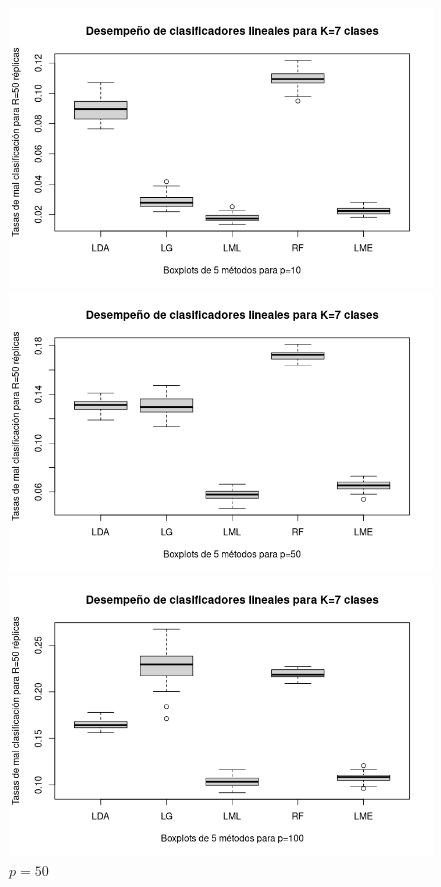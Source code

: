 \documentclass{report}
\begin{document}
  
  \begin{figure} [h]
  	\begin{multicols}{2}
  		\includegraphics[width=\linewidth]{7_clases_p10_sigma_II}\par 
  		\caption*{$p=10$}
  		\includegraphics[width=\linewidth]{7_clases_p50_sigma_II}\par 
  		\caption*{$p=50$}	 
  	\end{multicols}
  	\begin{multicols}{2}
  		\includegraphics[width=\linewidth]{7_clases_p100_sigma_II}\par

\end{multicols}
\end{figure}
\end{document}
